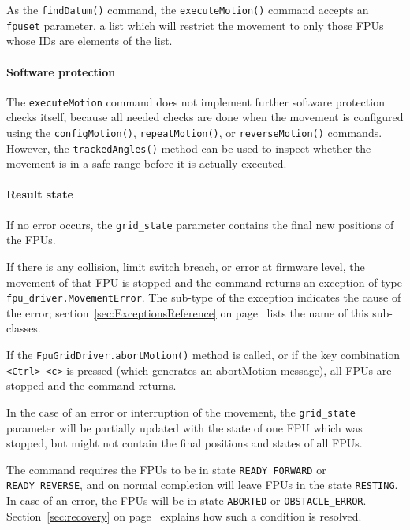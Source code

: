 \documentclass[11pt,a4paper]{scrartcl}
\begin{document}
As the \texttt{findDatum()} command, the \texttt{executeMotion()}
command accepts an \texttt{fpuset} parameter, a list which will
restrict the movement to only those FPUs whose IDs are elements of the
list.

\paragraph{Software protection}
The \texttt{executeMotion} command does not implement further software
protection checks itself, because all needed checks are done when the
movement is configured using the \texttt{configMotion()},
\texttt{repeatMotion()}, or \texttt{reverseMotion()}
commands. However, the \texttt{trackedAngles()} method can be used to
inspect whether the movement is in a safe range before it is actually
executed.

\paragraph{Result state}
If no error occurs, the \texttt{grid\_state} parameter contains the
final new positions of the FPUs.

If there is any collision, limit switch breach, or error at firmware
level, the movement of that FPU is stopped and the command returns an
exception of type \texttt{fpu\_driver.MovementError}. The sub-type of
the exception indicates the cause of the error;
section~\ref{sec:ExceptionsReference} on
page~\pageref{sec:ExceptionsReference} lists the name of this
sub-classes.

If the \texttt{FpuGridDriver.abortMotion()} method is called, or if
the key combination \texttt{<Ctrl>-<c>} is pressed (which generates an
abortMotion message), all FPUs are stopped and the command returns.

In the case of an error or interruption of the movement, the
\texttt{grid\_state} parameter will be partially updated with the
state of one FPU which was stopped, but might not contain the final
positions and states of all FPUs.

The command requires the FPUs to be in state \texttt{READY\_FORWARD}
or \texttt{READY\_REVERSE}, and on normal completion will leave FPUs
in the state \texttt{RESTING}. In case of an error, the FPUs will be
in state \texttt{ABORTED} or \texttt{OBSTACLE\_ERROR}.
Section~\ref{sec:recovery} on page~\pageref{sec:recovery} explains how
such a condition is resolved.
\end{document}
